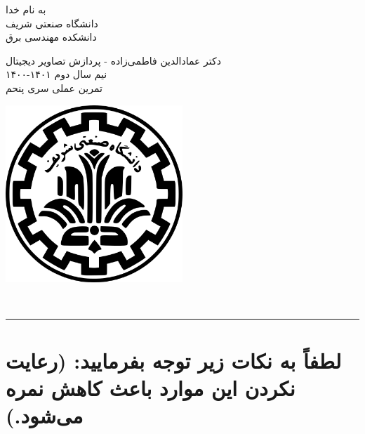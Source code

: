 \documentclass[a4paper]{article}
\begin{document}
\begin{minipage}{0.6\textwidth}
\begin{bf}
	\begin{center}
		به نام خدا\\
		\vspace{0.25cm}
		دانشگاه صنعتی شریف\\
		\vspace{0.25cm}
		دانشکده مهندسی برق\\
		\vspace{0.5cm}
	
	\large
	دکتر عمادالدین فاطمی‌زاده - پردازش تصاویر دیجیتال \\
	نیم سال دوم
	۱۴۰۱-۱۴۰۰\\
	\Large
	\vspace{0.4cm}
	تمرین عملی سری پنحم\\
	\end{center}
\end{bf}
\normalsize
\end{minipage} \hfill
\begin{minipage}{0.35\textwidth}
\begin{flushleft}
\includegraphics[width=0.5\textwidth]{Shariflogo.png}\\ \large
\end{flushleft}

 \end{minipage}
\\

\rule[0.1\baselineskip]{\textwidth}{1pt}

\large
\section*{
لطفاً به نکات زیر توجه بفرمایید: (رعایت نکردن این موارد باعث کاهش نمره می‌شود.)
}
\end{document}
